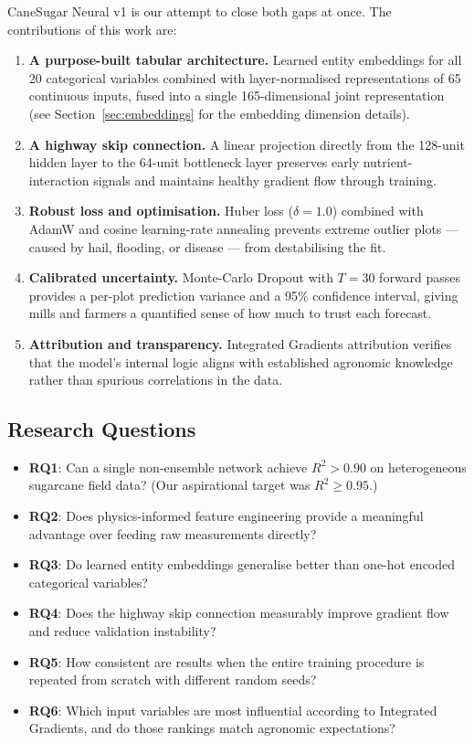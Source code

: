 \documentclass[conference,10pt,letterpaper]{IEEEtran}
\begin{document}
CaneSugar Neural v1 is our attempt to close both gaps at once. The contributions of this work are:
\begin{enumerate}
    \item \textbf{A purpose-built tabular architecture.} Learned entity embeddings for all 20 categorical variables combined with layer-normalised representations of 65 continuous inputs, fused into a single 165-dimensional joint representation (see Section~\ref{sec:embeddings} for the embedding dimension details).
    \item \textbf{A highway skip connection.} A linear projection directly from the 128-unit hidden layer to the 64-unit bottleneck layer preserves early nutrient-interaction signals and maintains healthy gradient flow through training.
    \item \textbf{Robust loss and optimisation.} Huber loss ($\delta = 1.0$) combined with AdamW and cosine learning-rate annealing prevents extreme outlier plots --- caused by hail, flooding, or disease --- from destabilising the fit.
    \item \textbf{Calibrated uncertainty.} Monte-Carlo Dropout with $T = 30$ forward passes provides a per-plot prediction variance and a 95\% confidence interval, giving mills and farmers a quantified sense of how much to trust each forecast.
    \item \textbf{Attribution and transparency.} Integrated Gradients attribution verifies that the model's internal logic aligns with established agronomic knowledge rather than spurious correlations in the data.
\end{enumerate}

\subsection{Research Questions}
\begin{itemize}
    \item \textbf{RQ1}: Can a single non-ensemble network achieve $R^2 > 0.90$ on heterogeneous sugarcane field data? (Our aspirational target was $R^2 \ge 0.95$.)
    \item \textbf{RQ2}: Does physics-informed feature engineering provide a meaningful advantage over feeding raw measurements directly?
    \item \textbf{RQ3}: Do learned entity embeddings generalise better than one-hot encoded categorical variables?
    \item \textbf{RQ4}: Does the highway skip connection measurably improve gradient flow and reduce validation instability?
    \item \textbf{RQ5}: How consistent are results when the entire training procedure is repeated from scratch with different random seeds?
    \item \textbf{RQ6}: Which input variables are most influential according to Integrated Gradients, and do those rankings match agronomic expectations?
\end{itemize}
\end{document}
